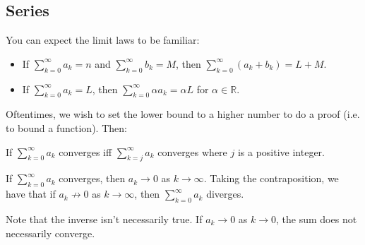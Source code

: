 \documentclass{article}
\begin{document}
    \subsection{Series}
    You can expect the limit laws to be familiar:
    \begin{itemize}
            \item If $\sum_{k=0}^\infty a_k = n$ and $\sum_{k=0}^\infty b_k = M$, then $\sum_{k=0}^\infty (a_k+b_k) = L+M$.
            \item If $\sum_{k=0}^\infty a_k = L$, then $\sum_{k=0}^\infty \alpha a_k = \alpha L$ for $\alpha \in \mathbb{R}$.
        \end{itemize}
    Oftentimes, we wish to set the lower bound to a higher number to do a proof (i.e. to bound a function). Then:
    \begin{theorem}
        If $\sum_{k=0}^{\infty} a_k$ converges iff $\sum_{k=j}^\infty a_k$ converges where $j$ is a positive integer.
    \end{theorem}
    \begin{theorem}
        If $\sum_{k=0}^\infty a_k$ converges, then $a_k \to 0$ as $k\to\infty$. Taking the contraposition, we have that if $a_k \not\to 0$ as $k\to \infty$, then $\sum_{k=0}^\infty a_k$ diverges.
    \end{theorem}
    Note that the inverse isn't necessarily true. If $a_k \to 0$ as $k\to 0$, the sum does not necessarily converge.
\end{document}

